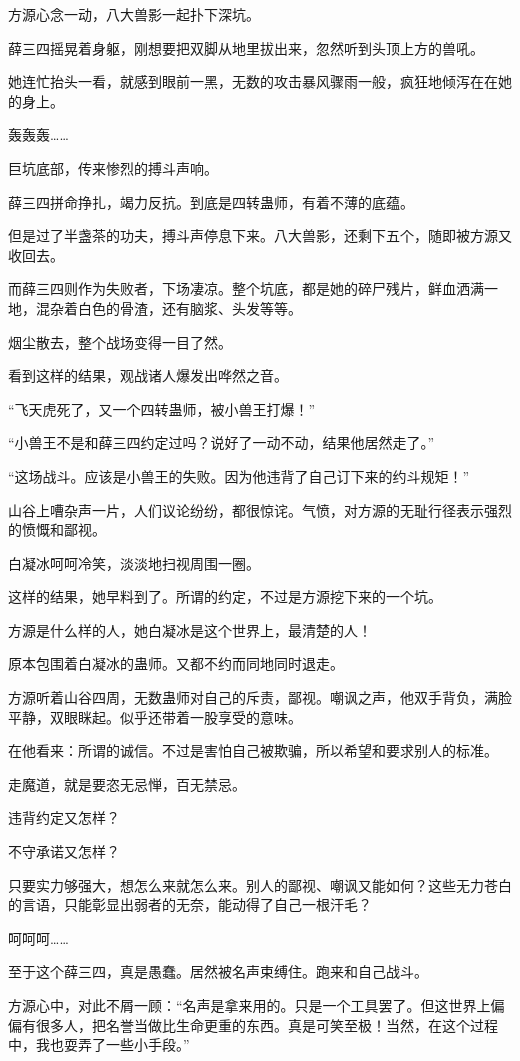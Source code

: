 \begin{this_body}
方源心念一动，八大兽影一起扑下深坑。

薛三四摇晃着身躯，刚想要把双脚从地里拔出来，忽然听到头顶上方的兽吼。

她连忙抬头一看，就感到眼前一黑，无数的攻击暴风骤雨一般，疯狂地倾泻在在她的身上。

轰轰轰……

巨坑底部，传来惨烈的搏斗声响。

薛三四拼命挣扎，竭力反抗。到底是四转蛊师，有着不薄的底蕴。

但是过了半盏茶的功夫，搏斗声停息下来。八大兽影，还剩下五个，随即被方源又收回去。

而薛三四则作为失败者，下场凄凉。整个坑底，都是她的碎尸残片，鲜血洒满一地，混杂着白色的骨渣，还有脑浆、头发等等。

烟尘散去，整个战场变得一目了然。

看到这样的结果，观战诸人爆发出哗然之音。

“飞天虎死了，又一个四转蛊师，被小兽王打爆！”

“小兽王不是和薛三四约定过吗？说好了一动不动，结果他居然走了。”

“这场战斗。应该是小兽王的失败。因为他违背了自己订下来的约斗规矩！”

山谷上嘈杂声一片，人们议论纷纷，都很惊诧。气愤，对方源的无耻行径表示强烈的愤慨和鄙视。

白凝冰呵呵冷笑，淡淡地扫视周围一圈。

这样的结果，她早料到了。所谓的约定，不过是方源挖下来的一个坑。

方源是什么样的人，她白凝冰是这个世界上，最清楚的人！

原本包围着白凝冰的蛊师。又都不约而同地同时退走。

方源听着山谷四周，无数蛊师对自己的斥责，鄙视。嘲讽之声，他双手背负，满脸平静，双眼眯起。似乎还带着一股享受的意味。

在他看来：所谓的诚信。不过是害怕自己被欺骗，所以希望和要求别人的标准。

走魔道，就是要恣无忌惮，百无禁忌。

违背约定又怎样？

不守承诺又怎样？

只要实力够强大，想怎么来就怎么来。别人的鄙视、嘲讽又能如何？这些无力苍白的言语，只能彰显出弱者的无奈，能动得了自己一根汗毛？

呵呵呵……

至于这个薛三四，真是愚蠢。居然被名声束缚住。跑来和自己战斗。

方源心中，对此不屑一顾：“名声是拿来用的。只是一个工具罢了。但这世界上偏偏有很多人，把名誉当做比生命更重的东西。真是可笑至极！当然，在这个过程中，我也耍弄了一些小手段。”


\end{this_body}
